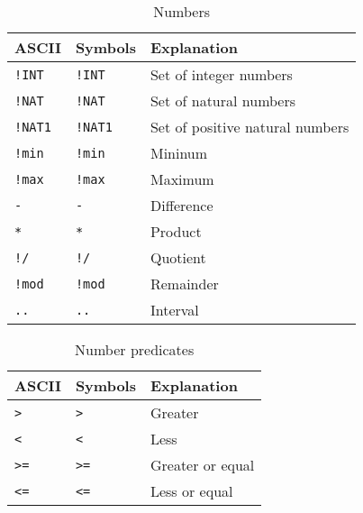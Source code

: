 \begin{EventBNoShortInline}
  \begin{table}[!htbp]
    \centering
    \begin{tabular}{|l|l|l|}
      \hline
      ASCII & Symbols & Explanation \\
      \hline
      \verb$!INT$ & \lstinline$!INT$ & Set of integer numbers \\
      \verb$!NAT$ & \lstinline$!NAT$ & Set of natural numbers \\
      \verb$!NAT1$ & \lstinline$!NAT1$ & Set of positive natural numbers \\
      \verb$!min$ & \lstinline$!min$ & Mininum \\
      \verb$!max$ & \lstinline$!max$ & Maximum \\
      \verb$-$ & \lstinline$-$ & Difference \\
      \verb$*$ & \lstinline$*$ & Product \\
      \verb$!/$ & \lstinline$!/$ & Quotient \\
      \verb$!mod$ & \lstinline$!mod$ & Remainder \\
      \verb$..$ & \lstinline$..$ & Interval  \\
      \hline
    \end{tabular}
    \caption{Numbers}
  \end{table}
  
  \begin{table}[!htbp]
    \centering
    \begin{tabular}{|l|l|l|}
      \hline
      ASCII & Symbols & Explanation \\
      \hline
      \verb$>$ & \lstinline$>$ & Greater \\
      \verb$<$ & \lstinline$<$ & Less \\
      \verb$>=$ & \lstinline$>=$ & Greater or equal \\
      \verb$<=$ & \lstinline$<=$ & Less or equal \\
      \hline
    \end{tabular}
    \caption{Number predicates}
  \end{table}
  

\end{EventBNoShortInline}
